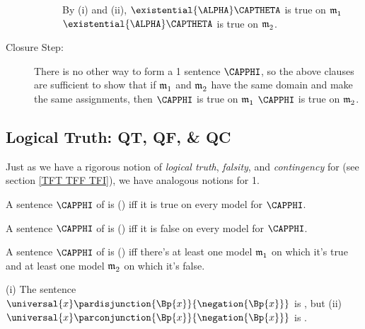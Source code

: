 \begin{PROOF}
\begin{description}
\begin{description}
			By (i) and (ii), $\existential{\ALPHA}\CAPTHETA$ is true on $\mathfrak{m^{\mathrm{}}_{\mathrm{1}}}$ \Iff $\existential{\ALPHA}\CAPTHETA$ is true on $\mathfrak{m^{\mathrm{}}_{\mathrm{2}}}$.
			
		\end{description}
		\item[Closure Step:] There is no other way to form a \GQL{}1 sentence $\CAPPHI$, so the above clauses are sufficient to show that if $\mathfrak{m^{\mathrm{}}_{\mathrm{1}}}$ and $\mathfrak{m^{\mathrm{}}_{\mathrm{2}}}$ have the same domain and make the same assignments, then $\CAPPHI$ is true on $\mathfrak{m^{\mathrm{}}_{\mathrm{1}}}$ \Iff $\CAPPHI$ is true on $\mathfrak{m^{\mathrm{}}_{\mathrm{2}}}$.
	\end{description}
\end{PROOF}





\subsection{Logical Truth: QT, QF, \& QC}\label{QT QT QI}
Just as we have a rigorous notion of \emph{logical truth}, \emph{falsity}, and \emph{contingency} for \GSL{} (see section \ref{TFT TFF TFI}), we have analogous notions for \GQL{}1.
\begin{majorILnc}{}
A sentence $\CAPPHI$ of \GQL{} is  () iff it is true on every model for $\CAPPHI$.
\end{majorILnc} 
\begin{majorILnc}{}
A sentence $\CAPPHI$ of \GQL{} is  () iff it is false on every model for $\CAPPHI$.
\end{majorILnc} 
\begin{majorILnc}{}
A sentence $\CAPPHI$ of \GQL{} is  () iff there's at least one model $\mathfrak{m^{\mathrm{}}_{\mathrm{1}}}$ on which it's true and at least one model $\mathfrak{m^{\mathrm{}}_{\mathrm{2}}}$ on which it's false.
\end{majorILnc} 
\begin{majorILnc}{}
(i) The sentence $\universal{\variable{x}}\pardisjunction{\Bp{\variable{x}}}{\negation{\Bp{\variable{x}}}}$ is , but (ii) $\universal{\variable{x}}\parconjunction{\Bp{\variable{x}}}{\negation{\Bp{\variable{x}}}}$ is .
\end{majorILnc}
